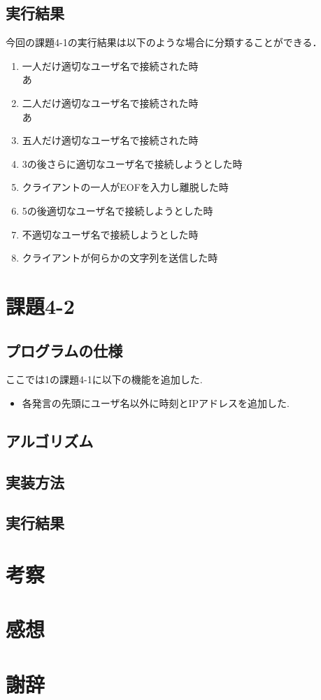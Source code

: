 \documentclass[dvipdfmx]{jarticle}
\begin{document}
\subsection{実行結果}
今回の課題4-1の実行結果は以下のような場合に分類することができる．
\begin{enumerate}
    \item 一人だけ適切なユーザ名で接続された時\\
    あ
    \item 二人だけ適切なユーザ名で接続された時\\
    あ
    \item 五人だけ適切なユーザ名で接続された時\\
    \item 3の後さらに適切なユーザ名で接続しようとした時\\
    \item クライアントの一人がEOFを入力し離脱した時\\
    \item 5の後適切なユーザ名で接続しようとした時\\
    \item 不適切なユーザ名で接続しようとした時\\
    \item クライアントが何らかの文字列を送信した時\\
\end{enumerate}
\section{課題4-2}
\subsection{プログラムの仕様}
ここでは1の課題4-1に以下の機能を追加した.
\begin{itemize}
    \item 各発言の先頭にユーザ名以外に時刻とIPアドレスを追加した.
\end{itemize}
\subsection{アルゴリズム}
\subsection{実装方法}
\subsection{実行結果}
\section{考察}
\section{感想}
\section{謝辞}
\end{document}
